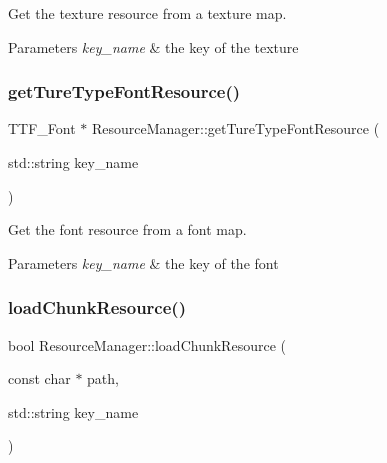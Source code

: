 Get the texture resource from a texture map. 


\begin{DoxyParams}{Parameters}
{\em key\+\_\+name} & the key of the texture \\
\hline
\end{DoxyParams}
\mbox{\label{class_resource_manager_a8add69b7cb3c0b1681e27a69c9e5ed4b}} 
\subsubsection{\texorpdfstring{get\+Ture\+Type\+Font\+Resource()}{getTureTypeFontResource()}}
{\footnotesize\ttfamily T\+T\+F\+\_\+\+Font $\ast$ Resource\+Manager\+::get\+Ture\+Type\+Font\+Resource (\begin{DoxyParamCaption}\item[{std\+::string}]{key\+\_\+name }\end{DoxyParamCaption})}



Get the font resource from a font map. 


\begin{DoxyParams}{Parameters}
{\em key\+\_\+name} & the key of the font \\
\hline
\end{DoxyParams}
\mbox{\label{class_resource_manager_a4023e88b858912a2b61b047e7bfedd42}} 
\subsubsection{\texorpdfstring{load\+Chunk\+Resource()}{loadChunkResource()}}
{\footnotesize\ttfamily bool Resource\+Manager\+::load\+Chunk\+Resource (\begin{DoxyParamCaption}\item[{const char $\ast$}]{path,  }\item[{std\+::string}]{key\+\_\+name }\end{DoxyParamCaption})}



